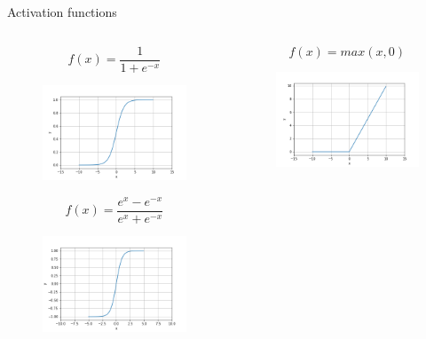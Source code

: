 \begin{frame}{Activation functions}
	\begin{columns}[T]
		\begin{column}{.5\textwidth}
			\tiny{
				\[
				f(x)=\frac{1}{1+e^{-x}}
				\]
			}
			\begin{figure}
				\includegraphics[width=.6\textwidth, center]{figuras/sigmoid.png}	
			\end{figure}
			\tiny{
				\[
				f(x)=\frac{e^x-e^{-x}}{e^x+e^{-x}}
				\]
			}
			\begin{figure}
				\includegraphics[width=.6\textwidth, center]{figuras/tanh.png}
			\end{figure}
		\end{column}
		\begin{column}{.5\textwidth}
			\tiny{
				\[
				f(x)=max(x,0)
				\]}
			\begin{figure}
				\includegraphics[width=.6\textwidth, center]{figuras/relu.png}	
			\end{figure}

\end{column}
\end{columns}
\end{frame}
